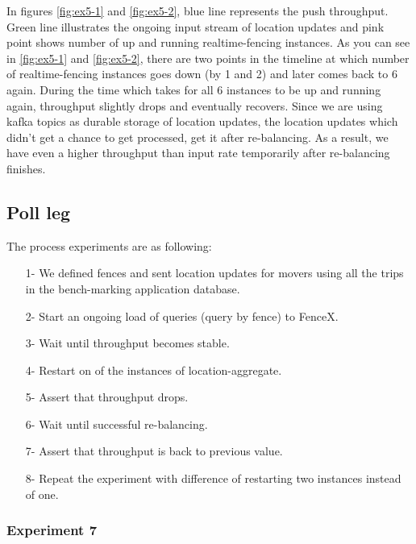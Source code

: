 \documentclass[a4]{report}
\begin{document}
        In figures \ref{fig:ex5-1} and \ref{fig:ex5-2}, blue line represents the push throughput.
        Green line illustrates the ongoing input stream of location updates and pink point shows
        number of up and running realtime-fencing instances.
        As you can see in \ref{fig:ex5-1} and \ref{fig:ex5-2}, there are two points in the timeline at which number of
        realtime-fencing
        instances goes down (by 1 and 2) and later comes back to 6 again.
        During the time which takes for all 6 instances to be up and running again, throughput slightly drops and
        eventually recovers.
        Since we are using kafka topics as durable storage of location updates, the location updates which
        didn't get a chance to get processed, get it after re-balancing.
        As a result, we have even a higher throughput than input rate temporarily after re-balancing finishes.

        \subsection{Poll leg}
        The process experiments are as following:
        \begin{itemize}
            \item[1-] We defined fences and sent location updates for movers using all the trips in the bench-marking
            application database.
            \item[2-] Start an ongoing load of queries (query by fence) to FenceX.
            \item[3-] Wait until throughput becomes stable.
            \item[4-] Restart on of the instances of location-aggregate.
            \item[5-] Assert that throughput drops.
            \item[6-] Wait until successful re-balancing.
            \item[7-] Assert that throughput is back to previous value.
            \item[8-] Repeat the experiment with difference of restarting two instances instead of one.
        \end{itemize}

        \clearpage

        \subsubsection{Experiment 7}
\end{document}
